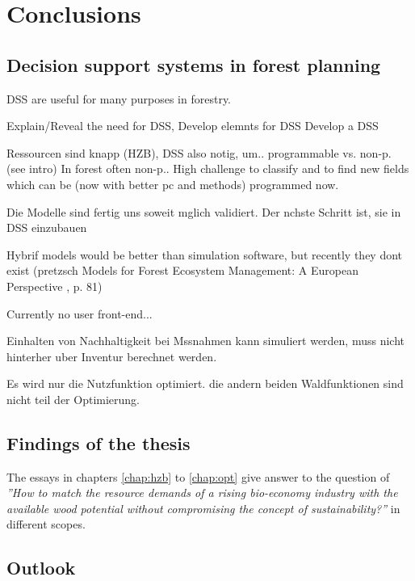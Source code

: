 \chapter{Conclusions}
\label{chap:discussion}
\newpage
\noindent
\section{Decision support systems in forest planning}
\label{sec:discussion:dss}
DSS are useful for many purposes in forestry.

Explain/Reveal the need for DSS, 
Develop elemnts for DSS
Develop a DSS

Ressourcen sind knapp (HZB), DSS also notig, um..
programmable vs. non-p. (see intro) In forest often non-p.. High challenge to classify and to find new fields which can be (now with better pc and methods) programmed now.

Die Modelle sind fertig uns soweit mglich validiert. Der nchste Schritt ist, sie in DSS einzubauen

Hybrif models would be better than simulation software, but recently they dont exist (pretzsch Models for Forest Ecosystem Management: A European Perspective
, p. 81)

Currently no user front-end...

Einhalten von Nachhaltigkeit bei Mssnahmen kann simuliert werden, muss nicht hinterher uber Inventur berechnet werden.

Es wird nur die Nutzfunktion optimiert. die andern beiden Waldfunktionen sind nicht teil der Optimierung.
\section{Findings of the thesis}
\label{sec:discussion:findings}
The essays in chapters \ref{chap:hzb} to \ref{chap:opt} give answer to the question of \textit{''How to match the resource demands of a rising bio-economy industry with the available wood potential without compromising the concept of sustainability?''} in different scopes.
\section{Outlook}
\label{sec:discussion:outlook}
